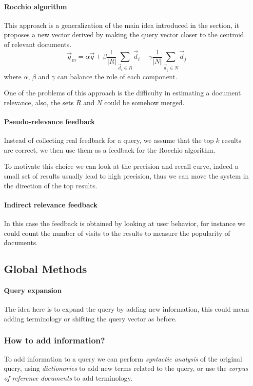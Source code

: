 \paragraph{Rocchio algorithm}
This approach is a generalization of the main idea introduced in the 
section, it proposes a new vector derived by making the query vector closer
to the centroid of relevant documents.
$$\vec{q}_m = \alpha\vec{q} + \beta\frac{1}{|R|}\sum_{\vec{d}_i \in R}\vec{d}_i 
- \gamma\frac{1}{|N|}\sum_{\vec{d}_j \in N}\vec{d}_j$$
where $\alpha$, $\beta$ and $\gamma$ can balance the role of each component.\

One of the problems of this approach is the difficulty in estimating a document 
relevance, also, the sets $R$ and $N$ could be somehow merged.

\paragraph{Pseudo-relevance feedback}
Instead of collecting real feedback for a query, we assume that the top $k$ 
results are correct, we then use them as a feedback for the Rocchio algorithm.

To motivate this choice we can look at the precision and recall curve, indeed
a small set of results usually lead to high precision, thus we can move the 
system in the direction of the top results. 

\paragraph{Indirect relevance feedback}
In this case the feedback is obtained by looking at user behavior, for instance 
we could count the number of visits to the results to measure the popularity of 
documents.

\subsection{Global Methods}
\paragraph{Query expansion}
The idea here is to expand the query by adding new information, 
this could mean adding terminology or shifting the query vector as before.

\subsubsection{How to add information?}
To add information to a query we can perform \emph{syntactic analysis} of 
the original query, using \emph{dictionaries} to add new terms related to the 
query, or use the \emph{corpus of reference documents} to add terminology.

